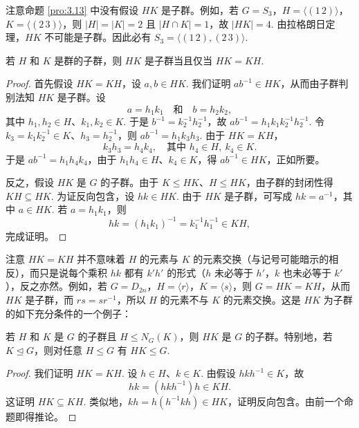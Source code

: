 注意命题 \ref{pro:3.13} 中没有假设 \(HK\) 是子群。例如，若 \(G = S_3\)，\(H = \langle (1\,2) \rangle\)，\(K = \langle (2\,3) \rangle\)，则 \(|H| = |K| = 2\) 且 \(|H \cap K| = 1\)，故 \(|HK| = 4\). 由拉格朗日定理，\(HK\) 不可能是子群。因此必有 \(S_3 = \langle (1\,2), (2\,3) \rangle\).

\begin{proposition}\label{pro:3.14}
若 \(H\) 和 \(K\) 是群的子群，则 \(HK\) 是子群当且仅当 \(HK = KH\).
\end{proposition}

\begin{proof}
首先假设 \(HK = KH\)，设 \(a, b \in HK\). 我们证明 \(ab^{-1} \in HK\)，从而由子群判别法知 \(HK\) 是子群。设
\[
a = h_1 k_1 \quad \text{和} \quad b = h_2 k_2,
\]
其中 \(h_1, h_2 \in H\)、\(k_1, k_2 \in K\). 于是 \(b^{-1} = k_2^{-1}h_2^{-1}\)，故 \(ab^{-1} = h_1 k_1 k_2^{-1} h_2^{-1}\). 令 \(k_3 = k_1 k_2^{-1} \in K\)、\(h_3 = h_2^{-1}\)，则 \(ab^{-1} = h_1 k_3 h_3\). 由于 \(HK = KH\)，
\[
k_3 h_3 = h_4 k_4, \quad \text{其中 } h_4 \in H,\ k_4 \in K.
\]
于是 \(ab^{-1} = h_1 h_4 k_4\)，由于 \(h_1 h_4 \in H\)、\(k_4 \in K\)，得 \(ab^{-1} \in HK\)，正如所要。

反之，假设 \(HK\) 是 \(G\) 的子群。由于 \(K \leq HK\)、\(H \leq HK\)，由子群的封闭性得 \(KH \subseteq HK\). 为证反向包含，设 \(hk \in HK\). 由于 \(HK\) 是子群，可写成 \(hk = a^{-1}\)，其中 \(a \in HK\). 若 \(a = h_1 k_1\)，则
\[
hk = (h_1 k_1)^{-1} = k_1^{-1} h_1^{-1} \in KH,
\]
完成证明。
\end{proof}

注意 \(HK = KH\) 并不意味着 \(H\) 的元素与 \(K\) 的元素交换（与记号可能暗示的相反），而只是说每个乘积 \(hk\) 都有 \(k'h'\) 的形式（\(h\) 未必等于 \(h'\)，\(k\) 也未必等于 \(k'\)），反之亦然。例如，若 \(G = D_{2n}\)，\(H = \langle r \rangle\)，\(K = \langle s \rangle\)，则 \(G = HK = KH\)，从而 \(HK\) 是子群，而 \(rs = sr^{-1}\)，所以 \(H\) 的元素不与 \(K\) 的元素交换。这是 \(HK\) 为子群的如下充分条件的一个例子：

\begin{corollary}\label{cor:3.15}
若 \(H\) 和 \(K\) 是 \(G\) 的子群且 \(H \leq N_G(K)\)，则 \(HK\) 是 \(G\) 的子群。特别地，若 \(K \trianglelefteq G\)，则对任意 \(H \leq G\) 有 \(HK \leq G\).
\end{corollary}

\begin{proof}
我们证明 \(HK = KH\). 设 \(h \in H\)、\(k \in K\). 由假设 \(hkh^{-1} \in K\)，故
\[
hk = (hkh^{-1})h \in KH.
\]
这证明 \(HK \subseteq KH\). 类似地，\(kh = h(h^{-1}kh) \in HK\)，证明反向包含。由前一个命题即得推论。
\end{proof}

